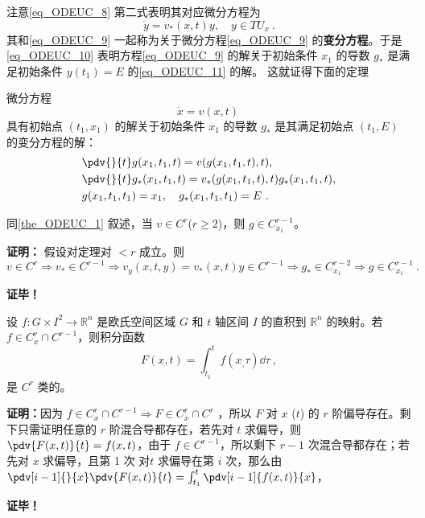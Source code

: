 注意\autoref{eq_ODEUC_8} 第二式表明其对应微分方程为
\begin{equation}\label{eq_ODEUC_11}
\dot y=v_*(x,t)y,\quad y\in TU_x~.
\end{equation}
其和\autoref{eq_ODEUC_9} 一起称为关于微分方程\autoref{eq_ODEUC_9} 的\textbf{变分方程}。于是\autoref{eq_ODEUC_10} 表明方程\autoref{eq_ODEUC_9} 的解关于初始条件 $x_1$ 的导数 $g_*$ 是满足初始条件 $y(t_1)=E$ 的\autoref{eq_ODEUC_11} 的解。
这就证得下面的定理
\begin{theorem}{}
微分方程
\begin{equation}
\dot x=v(x,t)~
\end{equation}
 具有初始点 $(t_1,x_1)$ 的解关于初始条件 $x_1$ 的导数 $g_*$ 是其满足初始点 $(t_1,E)$ 的变分方程的解：
 \begin{equation}
 \begin{aligned}
 &\pdv{}{t}g(x_1,t_1,t)=v(g(x_1,t_1,t),t),\\
 &\pdv{}{t}g_*(x_1,t_1,t)=v_*(g(x_1,t_1,t),t)g_*(x_1,t_1,t),\\
 &g(x_1,t_1,t_1)=x_1,\quad g_*(x_1,t_1,t_1)=E~.
 \end{aligned}
 \end{equation}
\end{theorem}
\begin{theorem}{}
同\autoref{the_ODEUC_1} 叙述，当 $v\in C^r$($r\geq2$)，则 $g\in C_{x_1}^{r-1}$。
\end{theorem}
\textbf{证明：} 假设对定理对 $<r$ 成立。则
\begin{equation}
 v\in C^r\Rightarrow v_*\in C^{r-1}\Rightarrow v_y(x,t,y)=v_*(x,t)y\in C^{r-1}\Rightarrow g_*\in C_{x_1}^{r-2}\Rightarrow g\in C_{x_1}^{r-1}~.
\end{equation}

\textbf{证毕！}
\begin{lemma}{}
设 $f:G\times I^2\rightarrow \mathbb R^n$ 是欧氏空间区域 $G$ 和 $t$ 轴区间 $I$ 的直积到 $\mathbb R^n$ 的映射。若 $f\in C_x^r \cap C^{r-1}$，则积分函数
\begin{equation}
F(x,t)=\int_{t_1}^t f(x_,\tau)\dd\tau~,
\end{equation}
是 $C^r$ 类的。
\end{lemma}
\textbf{证明：}因为 $f\in C_x^r\cap C^{r-1}\Rightarrow F\in C_x^r\cap C^{r}$ ，所以 $F$ 对 $x$ ($t$) 的 $r$ 阶偏导存在。剩下只需证明任意的 $r$ 阶混合导都存在，若先对 $t$ 求偏导，则 $\pdv{F(x,t)}{t}=f(x,t)$，由于 $f\in C^{r-1}$，所以剩下 $r-1$ 次混合导都存在；若先对 $x$ 求偏导，且第 1 次 对$t$ 求偏导在第 $i$ 次，那么由   $\pdv[i-1]{}{x}\pdv{F(x,t)}{t}=\int_{t_1}^t\pdv[i-1]{f(x,t)}{x}$，

\textbf{证毕！}